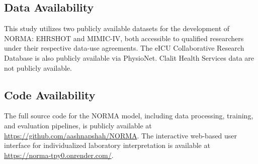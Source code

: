 \documentclass[11pt]{article}
\begin{document}
\subsection*{Data Availability}

This study utilizes two publicly available datasets for the development of NORMA: EHRSHOT and MIMIC-IV, both accessible to qualified researchers under their respective data-use agreements. The eICU Collaborative Research Database is also publicly available via PhysioNet. Clalit Health Services data are not publicly available.

\subsection*{Code Availability}

The full source code for the NORMA model, including data processing, training, and evaluation pipelines, is publicly available at \url{https://github.com/aashnapshah/NORMA}. The interactive web-based user interface for individualized laboratory interpretation is available at \url{https://norma-tpy0.onrender.com/}.


\clearpage

\clearpage

\clearpage

\end{document}
